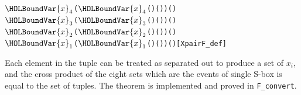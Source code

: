 \documentclass{article}
\begin{document}
\begin{alltt}
       \ensuremath{\HOLBoundVar{x}\sb{\mathrm{4}}} \HOLSymConst{\HOLTokenEor{}}  (\ensuremath{\HOLBoundVar{x}\sb{\mathrm{4}}} \HOLSymConst{\HOLTokenEor{}} ( \HOLSymConst{\HOLTokenExtract{}} ) ( )) \HOLSymConst{=} ( \HOLSymConst{\HOLTokenExtract{}} )  \HOLSymConst{\HOLTokenConj{}}
       \ensuremath{\HOLBoundVar{x}\sb{\mathrm{3}}} \HOLSymConst{\HOLTokenEor{}}  (\ensuremath{\HOLBoundVar{x}\sb{\mathrm{3}}} \HOLSymConst{\HOLTokenEor{}} ( \HOLSymConst{\HOLTokenExtract{}} ) ( )) \HOLSymConst{=} ( \HOLSymConst{\HOLTokenExtract{}} )  \HOLSymConst{\HOLTokenConj{}}
       \ensuremath{\HOLBoundVar{x}\sb{\mathrm{2}}} \HOLSymConst{\HOLTokenEor{}}  (\ensuremath{\HOLBoundVar{x}\sb{\mathrm{2}}} \HOLSymConst{\HOLTokenEor{}} ( \HOLSymConst{\HOLTokenExtract{}} ) ( )) \HOLSymConst{=} ( \HOLSymConst{\HOLTokenExtract{}} )  \HOLSymConst{\HOLTokenConj{}}
       \ensuremath{\HOLBoundVar{x}\sb{\mathrm{1}}} \HOLSymConst{\HOLTokenEor{}}  (\ensuremath{\HOLBoundVar{x}\sb{\mathrm{1}}} \HOLSymConst{\HOLTokenEor{}} ( \HOLSymConst{\HOLTokenExtract{}} ) ( )) \HOLSymConst{=} ( \HOLSymConst{\HOLTokenExtract{}} ) \HOLTokenRightbrace{}\hfill{[XpairF_def]}
\end{alltt}

Each element in the tuple can be treated as separated out to produce a set of $x_i$, and the cross product of the
eight sets which are the events of single S-box is equal to the set of tuples. The theorem is implemented and proved
in \verb|F_convert|.
\end{document}
